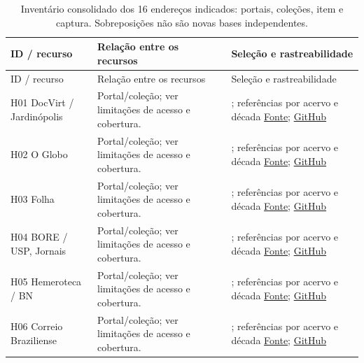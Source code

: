 \small\begin{longtable}{>{\raggedright\arraybackslash}p{}>{\raggedright\arraybackslash}p{}>{\raggedright\arraybackslash}p{}}
\caption{Inventário consolidado dos 16 endereços indicados: portais, coleções, item e captura. Sobreposições não são novas bases independentes.}\\
\toprule ID / recurso & Relação entre os recursos & Seleção e rastreabilidade\\\midrule\endfirsthead
\toprule ID / recurso & Relação entre os recursos & Seleção e rastreabilidade\\\midrule\endhead
H01 DocVirt / Jardinópolis \cite{r3archiveH01} & Portal/coleção; ver limitações de acesso e cobertura. & 11; referências por acervo e década \href{https://app.docvirt.com/dvd_ajhpmj/pageid/1}{Fonte}; \href{https://github.com/murilloed/historia-riso-escrito-portugues/blob/main/data/archive_decade_references.csv}{GitHub} \\
H02 O Globo \cite{r3archiveH02} & Portal/coleção; ver limitações de acesso e cobertura. & 11; referências por acervo e década \href{https://oglobo.globo.com/acervo/}{Fonte}; \href{https://github.com/murilloed/historia-riso-escrito-portugues/blob/main/data/archive_decade_references.csv}{GitHub} \\
H03 Folha \cite{r3archiveH03} & Portal/coleção; ver limitações de acesso e cobertura. & 11; referências por acervo e década \href{https://acervo.folha.com.br/index.do}{Fonte}; \href{https://github.com/murilloed/historia-riso-escrito-portugues/blob/main/data/archive_decade_references.csv}{GitHub} \\
H04 BORE / USP, Jornais \cite{r3archiveH04} & Portal/coleção; ver limitações de acesso e cobertura. & 15; referências por acervo e década \href{https://obrasraras.usp.br/xmlui/handle/123456789/4262}{Fonte}; \href{https://github.com/murilloed/historia-riso-escrito-portugues/blob/main/data/archive_decade_references.csv}{GitHub} \\
H05 Hemeroteca / BN \cite{r3archiveH05} & Portal/coleção; ver limitações de acesso e cobertura. & 25; referências por acervo e década \href{https://memoria.bn.gov.br/hdb/periodico.aspx}{Fonte}; \href{https://github.com/murilloed/historia-riso-escrito-portugues/blob/main/data/archive_decade_references.csv}{GitHub} \\
H06 Correio Braziliense \cite{r3archiveH06} & Portal/coleção; ver limitações de acesso e cobertura. & 7; referências por acervo e década \href{https://www.correiobraziliense.com.br/acervo}{Fonte}; \href{https://github.com/murilloed/historia-riso-escrito-portugues/blob/main/data/archive_decade_references.csv}{GitHub} \\

\end{longtable}
